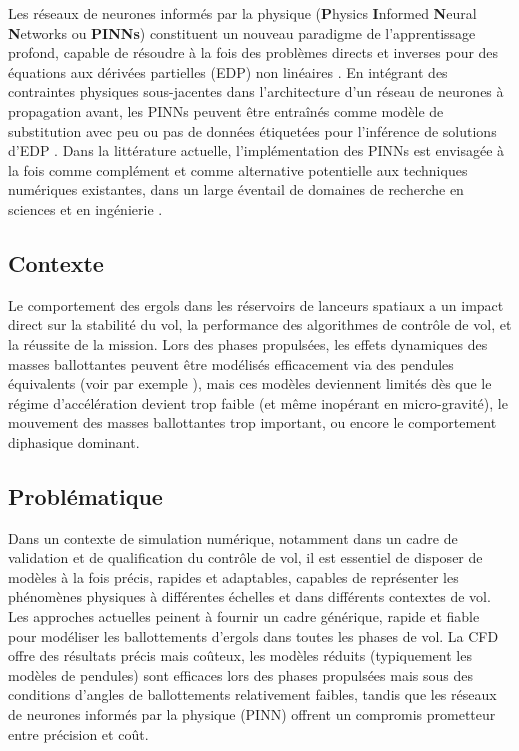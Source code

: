 \documentclass[12pt]{article}
\begin{document}
	Les réseaux de neurones informés par la physique (\textbf{P}hysics \textbf{I}nformed \textbf{N}eural \textbf{N}etworks ou \textbf{PINNs}) constituent un nouveau paradigme de l’apprentissage profond, capable de résoudre à la fois des problèmes directs et inverses pour des équations aux dérivées partielles (EDP) non linéaires \cite{raissiPhysicsinformedNeuralNetworks2019}. En intégrant des contraintes physiques sous-jacentes dans l’architecture d’un réseau de neurones à propagation avant, les PINNs peuvent être entraînés comme modèle de substitution avec peu ou pas de données étiquetées pour l’inférence de solutions d’EDP \cite{cuomoScientificMachineLearning2022}. Dans la littérature actuelle, l’implémentation des PINNs est envisagée à la fois comme complément et comme alternative potentielle aux techniques numériques existantes, dans un large éventail de domaines de recherche en sciences et en ingénierie \cite{maoPhysicsinformedNeuralNetworks2020,buosoPersonalisingLeftventricularBiophysical2021, caiPhysicsInformedNeuralNetworks2021}.
	
	\subsection*{Contexte}
	
	
	Le comportement des ergols dans les réservoirs de lanceurs spatiaux a un impact direct sur la stabilité du vol, la performance des algorithmes de contrôle de vol, et la réussite de la mission. Lors des phases propulsées, les effets dynamiques des masses ballottantes peuvent être modélisés efficacement via des pendules équivalents (voir par exemple \cite{ibrahimLiquidSloshingDynamics2005a}), mais ces modèles deviennent limités dès que le régime d’accélération devient trop faible (et même inopérant en micro-gravité), le mouvement des masses ballottantes trop important, ou encore le comportement diphasique dominant.
	
	\subsection*{Problématique}
	
	Dans un contexte de simulation numérique, notamment dans un cadre de validation et de qualification du contrôle de vol, il est essentiel de disposer de modèles à la fois précis, rapides et adaptables, capables de représenter les phénomènes physiques à différentes échelles et dans différents contextes de vol.
	Les approches actuelles peinent à fournir un cadre générique, rapide et fiable pour modéliser les ballottements d’ergols dans toutes les phases de vol. La CFD offre des résultats précis mais coûteux, les modèles réduits (typiquement les modèles de pendules) sont efficaces lors des phases propulsées mais sous des conditions d'angles de ballottements relativement faibles, tandis que les réseaux de neurones informés par la physique (PINN) offrent un compromis prometteur entre précision et coût.
	
\end{document}
